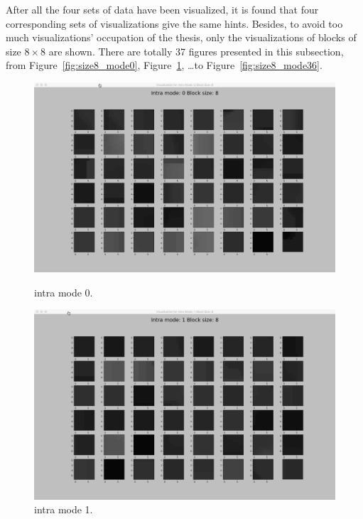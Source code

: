 After all the four sets of data have been visualized,
it is found that four corresponding sets of visualizations
give the same hints.
Besides, to avoid too much visualizations' occupation of the thesis,
only the visualizations of blocks of size $8\times8$
are shown.
There are totally 37 figures presented in this subsection,
from Figure~\ref{fig:size8_mode0}, Figure~\ref{fig:size8_mode1},
\ldots to Figure~\ref{fig:size8_mode36}.

\begin{figure}[H]

    \vspace*{1cm} %

    \begin{minipage}{0.49\textwidth}
        \includegraphics[width=\linewidth]{Figures/visu-size8x8/8-0}
        \caption[Intra mode 0]{intra mode 0.}
        \label{fig:size8_mode0}
    \end{minipage}
    \hspace{\fill} %
    \begin{minipage}{0.49\textwidth}
        \includegraphics[width=\linewidth]{Figures/visu-size8x8/8-1}
        \caption[Intra mode 1]{intra mode 1.}
        \label{fig:size8_mode1}
    \end{minipage}
    

\end{figure}
